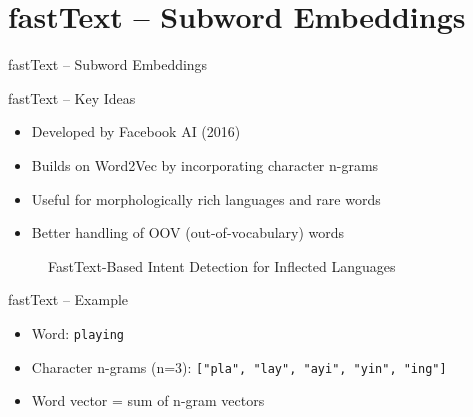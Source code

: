 \section{fastText – Subword Embeddings}
\begin{frame}{}
    \LARGE fastText – Subword Embeddings
\end{frame}

\begin{frame}[allowframebreaks]{fastText – Key Ideas}
    \begin{itemize}
        \item Developed by Facebook AI (2016)
        \item Builds on Word2Vec by incorporating character n-grams
        \item Useful for morphologically rich languages and rare words
        \item Better handling of OOV (out-of-vocabulary) words
    \end{itemize}
\framebreak
    \begin{figure}
        \centering
    \end{figure}
\framebreak
    \begin{figure}
        \centering
        \caption*{FastText-Based Intent Detection for Inflected Languages}
    \end{figure}
\end{frame}

\begin{frame}{fastText – Example}
    \begin{itemize}
        \item Word: \texttt{playing}
        \item Character n-grams (n=3): \texttt{["pla", "lay", "ayi", "yin", "ing"]}
        \item Word vector = sum of n-gram vectors
    \end{itemize}
\end{frame}

